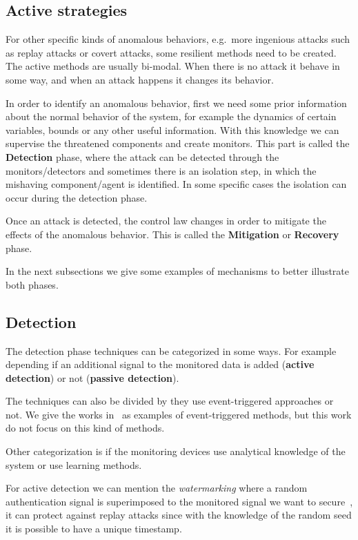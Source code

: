 \documentclass[../main.tex]{subfiles}
\begin{document}
\subsection{Active strategies}\label{sec:protecting_against_attacks}

For other specific kinds of anomalous behaviors, e.g.\ more ingenious attacks such as replay attacks or covert attacks, some resilient methods need to be created.
The active methods are usually bi-modal.
When there is no attack it behave in some way, and when an attack happens it changes its behavior.

In order to identify an anomalous behavior, first we need some prior information about the normal behavior of the system, for example the dynamics of certain variables, bounds or any other useful information.
With this knowledge we can supervise the threatened components and create monitors.
This part is called the \textbf{Detection} phase, where the attack can be detected through the monitors/detectors and sometimes there is an isolation step, in which the mishaving component/agent is identified.
In some specific cases the isolation can occur during the detection phase.

Once an attack is detected, the control law changes in order to mitigate the effects of the anomalous behavior.
This is called the \textbf{Mitigation} or \textbf{Recovery} phase.

In the next subsections we give some examples of mechanisms to better illustrate both phases.

\subsection{Detection}

The detection phase techniques can be categorized in some ways.
For example depending if an additional signal to the monitored data is added (\textbf{active detection}) or not (\textbf{passive detection}).

The techniques can also be divided by they use event-triggered approaches or not.
We give the works in~\cite{SunYang2019,HuEtAl2021,SunEtAl2022} as examples of event-triggered methods, but this work do not focus on this kind of methods.

Other categorization is if the monitoring devices use analytical knowledge of the system or use learning methods.

For active detection we can mention the \emph{watermarking} where a random authentication signal is superimposed to the monitored signal we want to secure~\cite{MoSinopoli2009,MoEtAl2015,SatchidanandanKumar2017,KshetriVoas2017,LuciaEtAl2021}, it can protect against replay attacks since with the knowledge of the random seed it is possible to have a unique timestamp.
\end{document}
